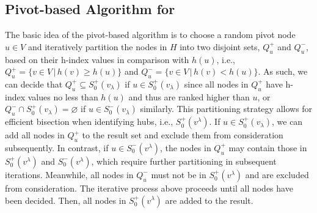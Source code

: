 \subsection{Pivot-based Algorithm for \ced}
\label{sec:hindex-global}

The basic idea of the pivot-based algorithm is to choose a random pivot node $u \in V$ and iteratively partition the nodes in $H$ into two disjoint sets, $Q^+_u$ and $Q^-_u$, based on their h-index values in comparison with $h(u)$, i.e., $Q^+_u = \{v \in V \,|\, h(v) \geq h(u)\}$ and $Q^-_u = \{v \in V \,|\, h(v) < h(u)\}$.
As such, we can decide that $Q^+_u \subseteq S^+_0(v_\lambda)$ if $u \in S^+_0(v_\lambda)$ since all nodes in $Q^+_u$ have h-index values no less than $h(u)$ and thus are ranked higher than $u$, or $Q^-_u \cap S^+_0(v_\lambda) = \varnothing$ if $u \in S^-_0(v_\lambda)$ similarly.
This partitioning strategy allows for efficient bisection when identifying hubs, i.e., $S^+_0(v^\lambda)$.
If $u \in S^+_0(v_\lambda)$, we can add all nodes in $Q^+_u$ to the result set and exclude them from consideration subsequently.
In contrast, if $u \in S^-_0(v^\lambda)$, the nodes in $Q^+_u$ may contain those in $S^+_0(v^\lambda)$ and $S^-_0(v^\lambda)$, which require further partitioning in subsequent iterations. Meanwhile, all nodes in $Q^-_u$ must not be in $S^+_0(v^\lambda)$ and are excluded from consideration.
The iterative process above proceeds until all nodes have been decided.
Then, all nodes in $S^+_0(v^\lambda)$ are added to the result.

